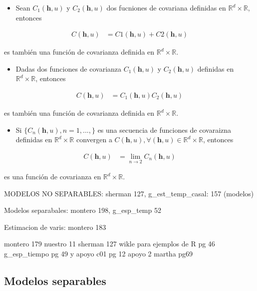 \documentclass[
]{book}
\providecommand{\tightlist}{%
  \setlength{\itemsep}{0pt}\setlength{\parskip}{0pt}}
\begin{document}
\begin{itemize}
\tightlist
\item
  Sean \(C_1(\textbf{h},u)\) y \(C_2(\textbf{h},u)\) dos fucniones de covariana definidas en \(\mathbb{R}^d \times \mathbb{R}\), entonces
\end{itemize}

\begin{align}
C(\textbf{h},u)&=C1(\textbf{h},u)+C2(\textbf{h},u)
\end{align}

es también una función de covarianza definida en \(\mathbb{R}^d \times \mathbb{R}\).

\begin{itemize}
\tightlist
\item
  Dadas dos funciones de covarianza \(C_1(\textbf{h},u)\) y \(C_2(\textbf{h},u)\) definidas en \(\mathbb{R}^d \times \mathbb{R}\), entonces
\end{itemize}

\begin{align}
C(\textbf{h},u)&=C_1(\textbf{h},u)C_2(\textbf{h},u)
\end{align}

es también una función de covarianza definida en \(\mathbb{R}^d\times \mathbb{R}\).

\begin{itemize}
\tightlist
\item
  Si \(\{C_n(\textbf{h},u),n=1,...,\}\) es una secuencia de funciones de covaraizna definidas en \(\mathbb{R}^d \times \mathbb{R}\) convergen a \(C(\textbf{h},u), \forall (\textbf{h},u) \in \mathbb{R}^d \times \mathbb{R}\), entonces
\end{itemize}

\begin{align}
C(\textbf{h},u)&=\lim_{n\to 2} C_n(\textbf{h},u)
\end{align}

es una función de covarianza en \(\mathbb{R}^d \times \mathbb{R}\).

MODELOS NO SEPARABLES: sherman 127, g\_est\_temp\_casal: 157 (modelos)

Modelos separabales: montero 198, g\_esp\_temp 52

Estimacion de varis: montero 183

montero 179
nuestro 11
sherman 127
wikle para ejemplos de R pg 46
g\_esp\_tiempo pg 49 y
apoyo c01 pg 12
apoyo 2 martha pg69

\hypertarget{modelos-separables}{%
\subsection{Modelos separables}\label{modelos-separables}}
\end{document}
